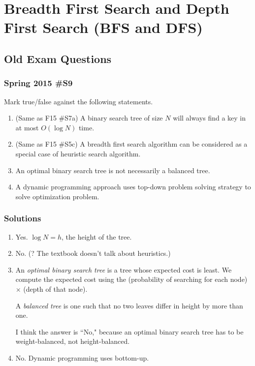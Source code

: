 \section{Breadth First Search and Depth First Search (BFS and DFS)}


\subsection{Old Exam Questions}

\subsubsection{Spring 2015 \#S9}	
	Mark true/false against the following statements. 
	\begin{enumerate}
		\item (Same as F15 \#S7a) A binary search tree of size $N$ will always find a key in at most $O(\log N)$ time.
		\item (Same as F15 \#S5c) A breadth first search algorithm can be considered as a special case of heuristic search algorithm.
		\item An optimal binary search tree is not necessarily a balanced tree.
		\item A dynamic programming approach uses top-down problem solving strategy to solve optimization problem.
	\end{enumerate}
	
\subsubsection{Solutions}

\begin{enumerate}
	\item Yes.  $\log N = h$, the height of the tree.  
	\item No. (?  The textbook doesn't talk about heuristics.)
	\item An {\it optimal binary search tree} is a tree whose expected cost is least.  We compute the expected cost using the (probability of searching for each node) $\times$ (depth of that node).  
	
	A {\it balanced tree} is one such that no two leaves differ in height by more than one.  
	
	I think the answer is ``No,"  because an optimal binary search tree has to be weight-balanced, not height-balanced.  
	\item No.  Dynamic programming uses bottom-up.  
\end{enumerate}

